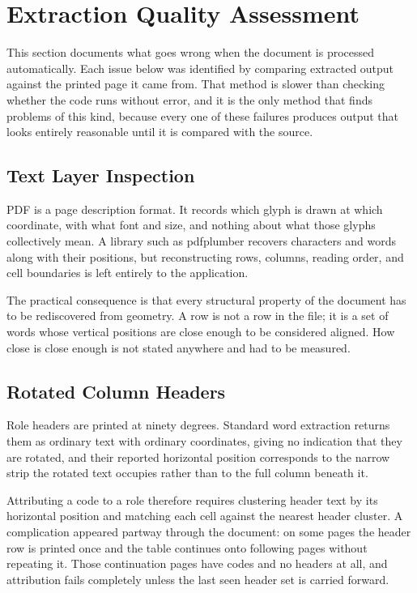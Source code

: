 \section{Extraction Quality Assessment}

This section documents what goes wrong when the document is processed automatically. Each issue below was identified by comparing extracted output against the printed page it came from. That method is slower than checking whether the code runs without error, and it is the only method that finds problems of this kind, because every one of these failures produces output that looks entirely reasonable until it is compared with the source.

\subsection{Text Layer Inspection}

PDF is a page description format. It records which glyph is drawn at which coordinate, with what font and size, and nothing about what those glyphs collectively mean. A library such as pdfplumber recovers characters and words along with their positions, but reconstructing rows, columns, reading order, and cell boundaries is left entirely to the application.

The practical consequence is that every structural property of the document has to be rediscovered from geometry. A row is not a row in the file; it is a set of words whose vertical positions are close enough to be considered aligned. How close is close enough is not stated anywhere and had to be measured.

\subsection{Rotated Column Headers}

Role headers are printed at ninety degrees. Standard word extraction returns them as ordinary text with ordinary coordinates, giving no indication that they are rotated, and their reported horizontal position corresponds to the narrow strip the rotated text occupies rather than to the full column beneath it.

Attributing a code to a role therefore requires clustering header text by its horizontal position and matching each cell against the nearest header cluster. A complication appeared partway through the document: on some pages the header row is printed once and the table continues onto following pages without repeating it. Those continuation pages have codes and no headers at all, and attribution fails completely unless the last seen header set is carried forward.

